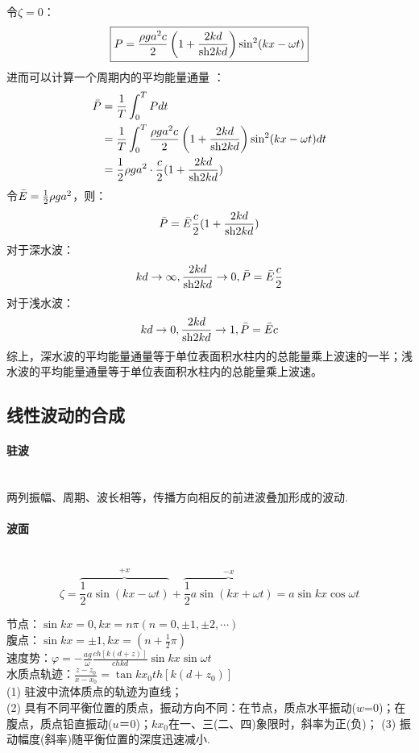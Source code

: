 \documentclass[a4paper,12pt]{article}
\begin{document}
	\indent
	令$\zeta=0$：
	\[
	\boxed{
	P=\frac{\rho g a^2 c}{2}\left(1+ \frac{2kd}{{\rm sh}2kd}\right)\sin^2(kx-\omega t)}
	\]
	\indent
	进而可以计算一个周期内的平均能量通量 ：
	\[
	\begin{aligned}
	\bar P &= {1 \over T}\int_0^T {Pdt} \\
	&= \frac{1}{T}\int_0^T\frac{\rho g a^2 c}{2}\left(1+ \frac{2kd}{{\rm sh}2kd}\right)\sin^2(kx-\omega t)dt\\
	&={1 \over 2}\rho g{a^2} \cdot {c \over 2}(1 + {{2kd} \over {\rm sh}2kd})
	\end{aligned}
	\]
	\indent
	令$\bar{E}={1 \over 2}\rho g{a^2}$，则：
	\[
	\bar{P}=\bar{E}{c \over 2}(1 + {{2kd} \over {\rm sh}2kd})
	\]
	\indent
	对于深水波：
	\[
	kd\rightarrow\infty,\frac{2kd}{{\rm sh}2kd}\rightarrow 0,\bar{P}=\bar{E}\frac{c}{2}
	\]
	\indent
	对于浅水波：
	\[
	kd\rightarrow 0,\frac{2kd}{{\rm sh}2kd}\rightarrow 1,\bar{P}=\bar{E}c
	\]
	\indent
    综上，深水波的平均能量通量等于单位表面积水柱内的总能量乘上波速的一半；浅水波的平均能量通量等于单位表面积水柱内的总能量乘上波速。
    \subsection{线性波动的合成}
    \paragraph{驻波}~{}\\
    两列振幅、周期、波长相等，传播方向相反的前进波叠加形成的波动.
    \paragraph{波面}~{}
    \[
        \zeta=\overbrace{\frac{1}{2}a\sin (kx-\omega t)}^{+x}+\overbrace{\frac{1}{2}a\sin (kx+\omega t)}^{-x}=a\sin kx\cos \omega t
    \]
    \begin{spacing}{2}
        节点：$\displaystyle \sin kx=0,kx=n\pi(n=0,\pm 1,\pm 2,\cdots)$\\
    腹点：$\displaystyle \sin kx=\pm 1,kx=(n+\frac{1}{2}\pi)$\\
    速度势：$\displaystyle \varphi=-\frac{a g}{\omega} \frac{c h[k(d+z)]}{c h k d} \sin k x \sin \omega t$\\
    水质点轨迹：$\displaystyle \frac{z-z_{0}}{x-x_{0}}=\tan k x_{0} t h\left[k\left(d+z_{0}\right)\right]$\\
    (1) 驻波中流体质点的轨迹为直线；\\
    (2) 具有不同平衡位置的质点，振动方向不同：在节点，质点水平振动($w$=0)；在腹点，质点铅直振动($u$＝0)；$kx_0$在一、三(二、四)象限时，斜率为正(负)；
    (3) 振动幅度(斜率)随平衡位置的深度迅速减小.
    \end{spacing}
\end{document}
